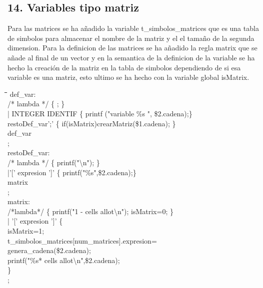 \documentclass[11pt,spanish]{article}
\begin{document}
		\subsection*{14. Variables tipo matriz }
		\label{subsec:14}
		Para las matrices se ha añadido la variable t\_simbolos\_matrices que es una tabla de simbolos para almacenar el nombre de la matriz y el el tamaño de la segunda dimension. Para la definicion de las matrices se ha añadido la regla matrix que se añade al final de un vector y en la semantica de la definicion de la variable se ha hecho la creación de la matriz en la tabla de simbolos dependiendo de si esa variable es una matriz, esto ultimo se ha hecho con la variable global isMatrix.
		\begin{tcolorbox}
		\begin{tabbing}
			\hspace*{0.5cm}\=\hspace*{1cm}\= \hspace*{3cm}\=\hspace*{0.5cm}\=\hspace*{0.5cm}\=\kill
			def\_var:   \\		   
				\> /* lambda */\> \>		\{ ; \}\\
				\>| INTEGER IDENTIF\> \> \{ printf ("variable \%s ", \$2.cadena);\} \\
				\>\>restoDef\_var';'\> \{ if(isMatrix)crearMatriz(\$1.cadena); \}\\
				\>\>def\_var\\
			;\\ 
			restoDef\_var:\\
			\>/* lambda */\>\> 		\{ printf("\textbackslash n"); \} \\
			\>|'[' expresion ']'\>\>	\{ printf("\%s",\$2.cadena);\} \\
			\>\>matrix\\
			;\\
			matrix:\\
			\>	/*lambda*/\>\>		 	\{ printf("1 - cells allot\textbackslash n"); isMatrix=0; \}\\
			\>	| '[' expresion	']'\>\>	\{\\
			\>\>\>\>						isMatrix=1;\\
			\>\>\>\>						t\_simbolos\_matrices[num\_matrices].expresion=\\
			\>\>\>\>\>genera\_cadena(\$2.cadena);\\
			\>\>\>\>						printf("\%s* cells allot\textbackslash n",\$2.cadena);\\
			\>\>\>						\}\\
			;
		\end{tabbing}
		\end{tcolorbox}
\end{document}
